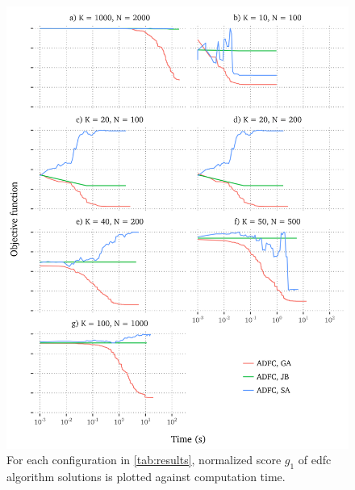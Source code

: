 \documentclass[12pt,journal,draftclsnofoot,onecolumn]{IEEEtran}
\begin{document}
\begin{figure}[htp]
	\includegraphics[]{figures/progress-adfc.png}
	\caption{For each configuration in \autoref{tab:results}, normalized score $g_1$ of \gls{edfc} algorithm solutions is plotted against computation time.}
	\label{fig:progress-adfc}
\end{figure}
\end{document}
